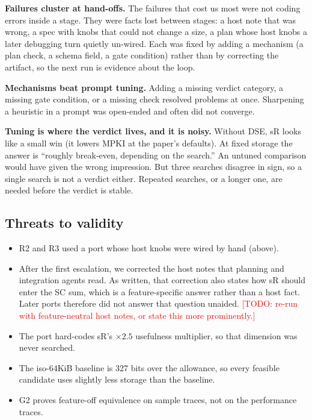 \documentclass[conference]{IEEEtran}
\newcommand{\todo}[1]{\textcolor{red}{[TODO: #1]}}
\begin{document}
\textbf{Failures cluster at hand-offs.} The failures that cost us most were not
coding errors inside a stage. They were facts lost between stages: a host note
that was wrong, a spec with knobs that could not change a size, a plan whose
host knobs a later debugging turn quietly un-wired. Each was fixed by adding a
mechanism (a plan check, a schema field, a gate condition) rather than by
correcting the artifact, so the next run is evidence about the loop.

\textbf{Mechanisms beat prompt tuning.} Adding a missing verdict category, a
missing gate condition, or a missing check resolved problems at once.
Sharpening a heuristic in a prompt was open-ended and often did not converge.

\textbf{Tuning is where the verdict lives, and it is noisy.} Without DSE, sR
looks like a small win (it lowers MPKI at the paper's defaults). At fixed
storage the answer is ``roughly break-even, depending on the search.'' An
untuned comparison would have given the wrong impression. But three searches
disagree in sign, so a single search is not a verdict either. Repeated
searches, or a longer one, are needed before the verdict is stable.

\subsection{Threats to validity}
\begin{itemize}
\item R2 and R3 used a port whose host knobs were wired by hand (above).
\item After the first escalation, we corrected the host notes that planning and
integration agents read. As written, that correction also states how sR should
enter the SC sum, which is a feature-specific answer rather than a host fact.
Later ports therefore did not answer that question unaided.
\todo{re-run with feature-neutral host notes, or state this more prominently.}
\item The port hard-codes sR's $\times 2.5$ usefulness multiplier, so that
dimension was never searched.
\item The iso-64KiB baseline is 327 bits over the allowance, so every feasible
candidate uses slightly less storage than the baseline.
\item G2 proves feature-off equivalence on sample traces, not on the
performance traces.
\end{itemize}

\end{document}
